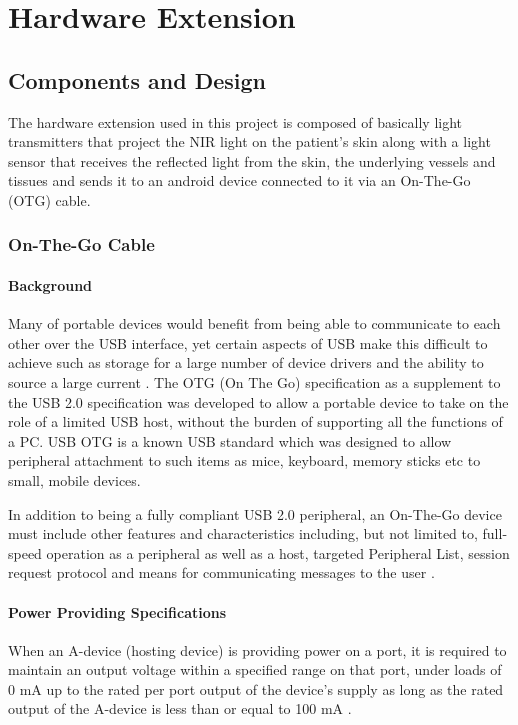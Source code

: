 
\chapter{Hardware Extension}\label{chapter:Hardware Extension}

\section{Components and Design}
The hardware extension used in this project is composed of basically light transmitters that project the NIR light on the patient’s skin along with a light sensor that receives the reflected light from the skin, the underlying vessels and tissues and sends it to an android device connected to it via an On-The-Go (OTG) cable.

\subsection{On-The-Go Cable}
\subsubsection{Background}
Many of portable devices would benefit from being able to communicate to each other over the USB interface, yet certain aspects of USB make this difficult to achieve such as storage for a large number of device drivers and the ability to source a large current \parencite{otg}.
The OTG (On The Go) specification as a supplement to the USB 2.0 specification was developed to allow a portable device to take on the role of a limited USB host, without the burden of supporting all the functions of a PC.
USB OTG is a known USB standard which was designed to allow peripheral attachment to such items as mice, keyboard, memory sticks etc to small, mobile devices.

In addition to being a fully compliant USB 2.0 peripheral, an On-The-Go device must include other features and characteristics including, but not limited to, full-speed operation as a peripheral as well as a host, targeted Peripheral List, session request protocol and means for communicating messages to the user \parencite{otg}.

\subsubsection{Power Providing Specifications}
When an A-device (hosting device) is providing power on a port, it is required to maintain an output voltage within a specified range on that port, under loads of 0 mA up to the rated per port output of the device’s supply as long as the rated output of the A-device is less than or equal to 100 mA \parencite{otg}.

